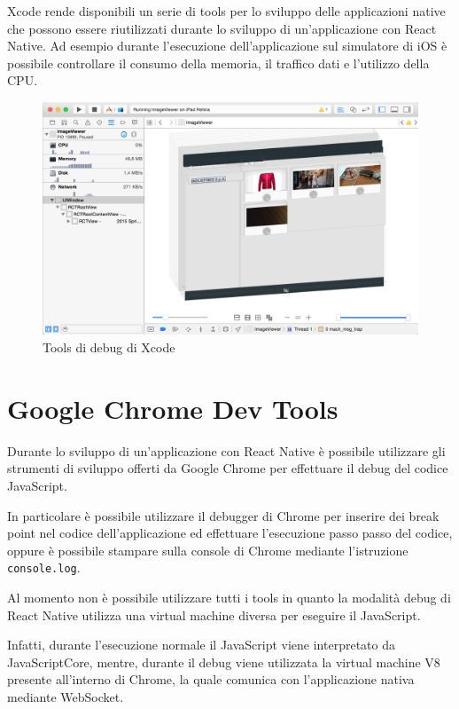 Xcode rende disponibili un serie di tools per lo sviluppo delle applicazioni native che possono essere riutilizzati durante lo sviluppo di un'applicazione con React Native. Ad esempio durante l'esecuzione dell'applicazione sul simulatore di iOS è possibile controllare il consumo della memoria, il traffico dati e l'utilizzo della CPU.

\begin{figure}[htp]
\centering
\includegraphics[width=\textwidth]{../immagini/xcode-tools}
\caption{Tools di debug di Xcode}  
\end{figure}
\FloatBarrier

\section{Google Chrome Dev Tools}\label{sec:chrome}

Durante lo sviluppo di un'applicazione con React Native è possibile utilizzare gli strumenti di sviluppo offerti da Google Chrome per effettuare il debug del codice JavaScript.

In particolare è possibile utilizzare il debugger di Chrome per inserire dei break point nel codice dell'applicazione ed effettuare l'esecuzione passo passo del codice, oppure è possibile stampare sulla console di Chrome mediante l'istruzione \texttt{console.log}.

Al momento non è possibile utilizzare tutti i tools in quanto la modalità debug di React Native utilizza una virtual machine diversa per eseguire il JavaScript.

Infatti, durante l'esecuzione normale il JavaScript viene interpretato da JavaScriptCore, mentre, durante il debug viene utilizzata la virtual machine V8 presente all'interno di Chrome, la quale comunica con l'applicazione nativa mediante WebSocket.


